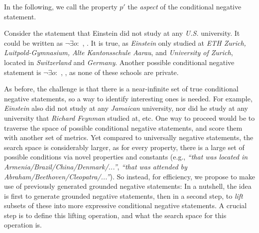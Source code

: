 In the following, we call the property $p'$ the \textit{aspect} of the conditional negative statement.

\begin{example}
Consider the statement that Einstein did not study at any \textit{U.S.} university. It could be written as $\neg\exists o:$ , . It is true, as \textit{Einstein} only studied at \textit{ETH Zurich, Luitpold-Gymnasium, Alte Kantonsschule Aarau}, and \textit{University of Zurich}, located in \textit{Switzerland} and \textit{Germany}. Another possible conditional negative statement is $\neg\exists o:$ , , as none of these schools are private.  %
\end{example}

As before, the challenge is that there is a near-infinite set of true conditional negative statements, so a way to identify interesting ones is needed. For example, \textit{Einstein} also did not study at any \textit{Jamaican} university, nor did he study at any university that \textit{Richard Feynman} studied at, etc. 
One way to proceed would be to traverse the space of possible conditional negative statements, and score them with another set of metrics. Yet compared to universally negative statements, the search space is considerably larger, as for every property, there is a large set of possible conditions via novel properties and constants (e.g., \textit{``that was located in Armenia/Brazil/China/Denmark/...''}, \textit{``that was attended by Abraham/Beethoven/Cleopatra/...''}). 
So instead, for efficiency, we propose to make use of previously generated grounded negative statements: In a nutshell, the idea is first to generate grounded negative statements, then in a second step, to \emph{lift} subsets of these into more expressive conditional negative statements. 
A crucial step is to define this lifting operation, and what the search space for this operation is.

